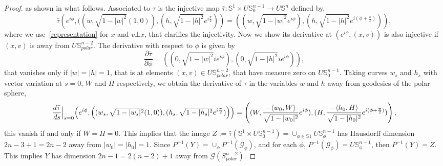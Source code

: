 \documentclass[11pt,a4paper,times]{amsart}
\theoremstyle{plain}
\theoremstyle{definition}
\numberwithin{equation}{section}
\newcommand{\Se}{\mathbb{S}}
\begin{document}
{\begin{proof}
as shown in what follows.
Associated to $\tau$ is the injective map $\bar{\tau}:\Se^1\times  U\Se^{n-1}_0\!\to \!U\Se^n$ defined by,
\[\bar{\tau}\left(e^{i\phi},((w, \sqrt{1-|w|^2}(1,0)), (h, \sqrt{1-|h|^2}e^{i\frac{\pi}{2}})\right)= \left((w, \sqrt{1-|w|^2}e^{i\phi}), (h, \sqrt{1-|h|^2}e^{i(\phi+\frac{\pi}{2})})\right), \]
where we use~\eqref{representation} for $x$ and  $v\bot x$, that clarifies the injectivity. Now we show  its derivative at $(e^{i\phi},(x,v))$ is also injective if {$(x,v)$  is away from  $U\mathbb{S}^{n-2}_{polar}$}. 
The derivative with respect to $\phi$ is given by
\[\frac{\partial \bar{\tau}}{\partial \phi}=((0, \sqrt{1-|w|^2}ie^{i\phi}), (0, \sqrt{1-|h|^2}ie^{i\phi})), \]
that vanishes only if $|w|=|h|=1$, that is at elements $(x,v)\in U\Se^{n-2}_{polar}$, that have measure zero on $U\Se_0^{n-1}$. Taking curves $ w_s$ and $ h_s$ with
vector variation at $s=0$, $W$ and $H$ respectively, we obtain the derivative of $\tau$ in the variables $w$ and $h$ away from {geodesics} of the polar sphere,
\begin{gather*}
\frac{d \bar{\tau}}{ds}\Big{|}_{s=0}\!\left(e^{i\phi}, \left((w_s, \sqrt{1-|w_s|^2}(1,0)), (h_s, \sqrt{1-|h_s|^2}e^{i\frac{\pi}{2}})\right)\right)=
\left((W, \frac{-\langle w_0,W\rangle}{\sqrt{1-|w_0|^2}}e^{i\phi}),
(H, \frac{-\langle h_0,H\rangle}{\sqrt{1-|h_0|^2}}e^{i(\phi+\frac{\pi}{2})})                                                                                                                                                                                                                                                                                                                                                                                                                                                                                                                                                                                                                                                                                                              \right), 
\end{gather*}
this vanish if and only if $W=H=0$.  This implies that the image $Z:=\bar{\tau}( \Se^1\times U\Se_0^{n-1})=
\cup_{\phi\in \Se1} U\Se^{n-1}_{\phi}$ has Hausdorff dimension
$2n-3 +1 =2n-2$ away  from $|w_0|=|h_0|=1$. Since $P^{-1}(Y)=\cup_{\phi} P^{-1}(\mathcal{G}_{\phi})$,  and for each $\phi$,  $P^{-1}(\mathcal{G}_{\phi})=U\mathbb{S}^{n-1}_{\phi}$, then $P^{-1}(Y)=Z$. This implies $Y$ has dimension $2n-1=2(n-2)+1$  away from $\mathcal{G}({S}^{n-2}_{polar})$.
\smallskip


\end{proof}}
\end{document}
